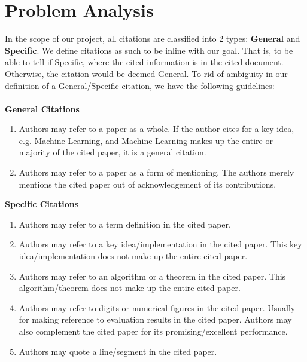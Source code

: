 \chapter{Problem Analysis}
\label{problemanalysis}

In the scope of our project, all citations are classified into 2 types: \textbf{General} and \textbf{Specific}. We define citations as such to be inline with our goal. That is, to be able to tell if Specific, where the cited information is in the cited document. Otherwise, the citation would be deemed General. To rid of ambiguity in our definition of a General/Specific citation, we have the following guidelines: \\ \\
\textbf{General Citations}
\begin{enumerate}
\item Authors may refer to a paper as a whole. If the author cites for a key idea, e.g. Machine Learning, and Machine Learning makes up the entire or majority of the cited paper, it is a general citation.
\item Authors may refer to a paper as a form of mentioning. The authors merely mentions the cited paper out of acknowledgement of its contributions.
\end{enumerate}
\textbf{Specific Citations}
\begin{enumerate}
\item Authors may refer to a term definition in the cited paper.
\item Authors may refer to a key idea/implementation in the cited paper. This key idea/implementation does not make up the entire cited paper.
\item Authors may refer to an algorithm or a theorem in the cited paper. This algorithm/theorem does not make up the entire cited paper.
\item Authors may refer to digits or numerical figures in the cited paper. Usually for making reference to evaluation results in the cited paper. Authors may also complement the cited paper for its promising/excellent performance.
\item Authors may quote a line/segment in the cited paper.
\end{enumerate}

